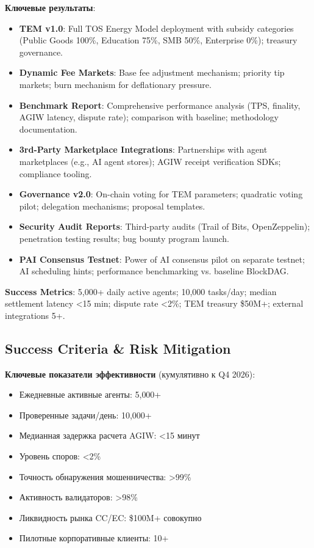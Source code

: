 \documentclass[11pt]{article}
\begin{document}
\textbf{Ключевые результаты}:
\begin{itemize}[noitemsep]
  \item \textbf{TEM v1.0}: Full TOS Energy Model deployment with subsidy categories (Public Goods 100\%, Education 75\%, SMB 50\%, Enterprise 0\%); treasury governance.
  \item \textbf{Dynamic Fee Markets}: Base fee adjustment mechanism; priority tip markets; burn mechanism for deflationary pressure.
  \item \textbf{Benchmark Report}: Comprehensive performance analysis (TPS, finality, AGIW latency, dispute rate); comparison with baseline; methodology documentation.
  \item \textbf{3rd-Party Marketplace Integrations}: Partnerships with agent marketplaces (e.g., AI agent stores); AGIW receipt verification SDKs; compliance tooling.
  \item \textbf{Governance v2.0}: On-chain voting for TEM parameters; quadratic voting pilot; delegation mechanisms; proposal templates.
  \item \textbf{Security Audit Reports}: Third-party audits (Trail of Bits, OpenZeppelin); penetration testing results; bug bounty program launch.
  \item \textbf{PAI Consensus Testnet}: Power of AI consensus pilot on separate testnet; AI scheduling hints; performance benchmarking vs. baseline BlockDAG.
\end{itemize}

\textbf{Success Metrics}: 5,000+ daily active agents; 10,000 tasks/day; median settlement latency <15 min; dispute rate <2\%; TEM treasury \$50M+; external integrations 5+.

\subsection{Success Criteria \& Risk Mitigation}

\textbf{Ключевые показатели эффективности} (кумулятивно к Q4 2026):
\begin{itemize}[noitemsep]
  \item Ежедневные активные агенты: 5{,}000+
  \item Проверенные задачи/день: 10{,}000+
  \item Медианная задержка расчета AGIW: <15 минут
  \item Уровень споров: <2\%
  \item Точность обнаружения мошенничества: >99\%
  \item Активность валидаторов: >98\%
  \item Ликвидность рынка CC/EC: \$100M+ совокупно
  \item Пилотные корпоративные клиенты: 10+
\end{itemize}
\end{document}
